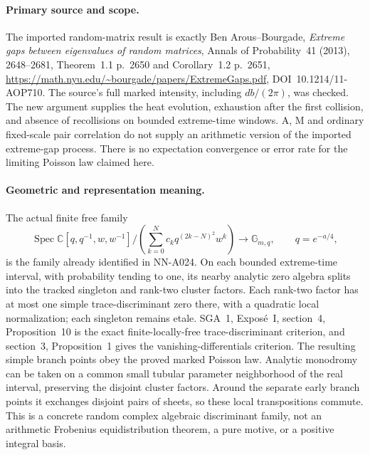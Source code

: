 \paragraph{Primary source and scope.}
The imported random-matrix result is exactly Ben Arous--Bourgade,
\emph{Extreme gaps between eigenvalues of random matrices},
Annals of Probability~41 (2013), 2648--2681,
Theorem~1.1 p.~2650 and Corollary~1.2 p.~2651,
\url{https://math.nyu.edu/~bourgade/papers/ExtremeGaps.pdf},
DOI~10.1214/11-AOP710. The source's full marked intensity,
including $db/(2\pi)$, was checked. The new argument supplies
the heat evolution, exhaustion after the first collision,
and absence of recollisions on bounded extreme-time windows.
A, M and ordinary fixed-scale pair correlation do not supply
an arithmetic version of the imported extreme-gap process.
There is no expectation convergence or error rate for the
limiting Poisson law claimed here.

\paragraph{Geometric and representation meaning.}
The actual finite free family
\[
 \operatorname{Spec}\mathbb C[q,q^{-1},w,w^{-1}]/
       \left(\sum_{k=0}^Nc_kq^{(2k-N)^2}w^k\right)
                           \longrightarrow\mathbb G_{m,q},
                  \qquad q=e^{-a/4},
\]
is the family already identified in NN-A024. On each bounded
extreme-time interval, with probability tending to one, its
nearby analytic zero algebra splits into the tracked singleton
and rank-two cluster factors. Each rank-two factor has at
most one simple trace-discriminant zero there, with a quadratic
local normalization; each singleton remains etale. SGA~1,
Expos\'e~I, section~4, Proposition~10 is the exact finite-locally-free
trace-discriminant criterion, and section~3, Proposition~1 gives
the vanishing-differentials criterion. The resulting simple
branch points obey the proved marked Poisson law. Analytic
monodromy can be taken on a common small tubular parameter
neighborhood of the real interval, preserving the disjoint
cluster factors. Around the separate early branch points it
exchanges disjoint pairs of sheets, so these local transpositions
commute.
This is a concrete random complex algebraic discriminant family,
not an arithmetic Frobenius equidistribution theorem, a pure
motive, or a positive integral basis.
